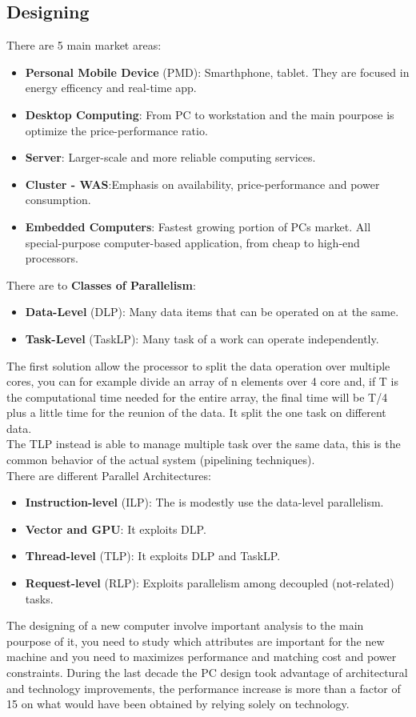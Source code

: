 \documentclass[12pt]{article}
\begin{document}
\subsection{Designing}
There are 5 main market areas:
\begin{itemize}
  \item \textbf{Personal Mobile Device} (PMD): Smarthphone, tablet. They are focused in energy efficency and real-time app.
  \item \textbf{Desktop Computing}: From PC to workstation and the main pourpose is optimize the price-performance ratio.
  \item \textbf{Server}: Larger-scale and more reliable computing services.
  \item \textbf{Cluster - WAS}:Emphasis on availability, price-performance and power consumption.
  \item \textbf{Embedded Computers}: Fastest growing portion of PCs market. All special-purpose computer-based application, from cheap to high-end processors.
\end{itemize}
There are to \textbf{Classes of Parallelism}:
\begin{itemize}
  \item \textbf{Data-Level} (DLP): Many data items that can be operated on at the same.
  \item \textbf{Task-Level} (TaskLP): Many task of a work can operate independently.
\end{itemize}
The first solution allow the processor to split the data operation over multiple cores, you can for example divide an array of n elements over 4 core and, if T is the computational time needed for the entire array, the final time will be T/4 plus a little time for the reunion of the data. It split the one task on different data.\\
The TLP instead is able to manage multiple task over the same data, this is the common behavior of the actual system (pipelining techniques).\\
There are different Parallel Architectures:
\begin{itemize}
  \item \textbf{Instruction-level} (ILP): The is modestly use the data-level parallelism.
  \item \textbf{Vector and GPU}: It exploits DLP.
  \item \textbf{Thread-level} (TLP): It exploits DLP and TaskLP.
  \item \textbf{Request-level} (RLP): Exploits parallelism among decoupled (not-related) tasks.
\end{itemize}
The designing of a new computer involve important analysis to the main pourpose of it, you need to study which attributes are important for the new machine and you need to maximizes performance and matching cost and power constraints. During the last decade the PC design took advantage of architectural and technology improvements, the performance increase is more than a factor of 15 on what would have been obtained by relying solely on technology.\\
\end{document}
